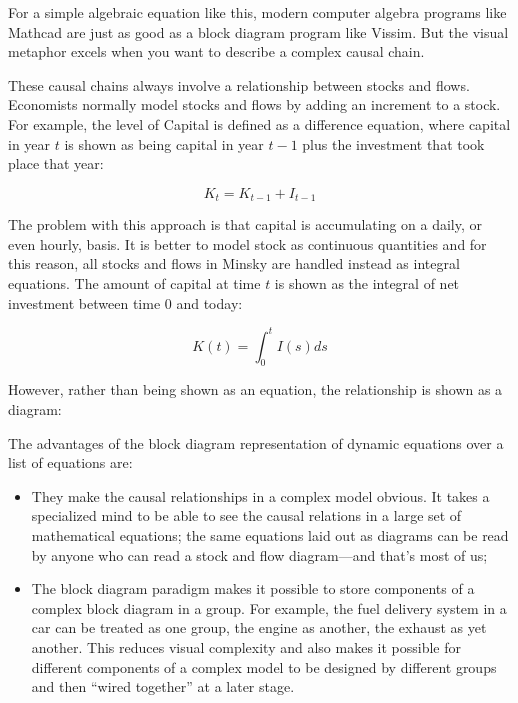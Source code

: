 \begin{center}
\end{center}

For a simple algebraic equation like this, modern computer algebra
programs like Mathcad are just as good as a block diagram program like
Vissim. But the visual metaphor excels when you want to describe a
complex causal chain.


These causal chains always involve a relationship between stocks and
flows. Economists normally model stocks and flows by adding an
increment to a stock. For example, the level of Capital is defined as
a difference equation, where capital in year $t$ is shown as being 
capital in year $t-1$ plus the investment that took place that year:

\begin{displaymath}
K_t=K_{t-1}+I_{t-1}
\end{displaymath}

The problem with this approach is that capital is accumulating on a daily, 
or even hourly, basis. It is better to model stock as continuous quantities
and for this reason, all stocks and flows in Minsky are handled instead 
as integral equations. The amount of capital at time $t$ is shown as 
the integral of net investment between time 0 and today:

\begin{displaymath}
K(t)=\int_0^t I(s)ds
\end{displaymath}

However, rather than being shown as an equation, the relationship is shown as a diagram:

\begin{center}
\end{center}

The advantages of the block diagram representation of dynamic equations
over a list of equations are:
\begin{itemize}
\item    They make the causal relationships in a complex model
  obvious. It takes a specialized mind to be able to see the causal
  relations in a large set of mathematical equations; the same
  equations laid out as diagrams can be read by anyone who can read
  a stock and flow diagram---and that's most of us;
\item The block diagram paradigm makes it possible to store components of
  a complex block diagram in a group. For example, the fuel delivery
  system in a car can be treated as one group, the engine as another,
  the exhaust as yet another. This reduces visual complexity and also
  makes it possible for different components of a complex model to be
  designed by different groups and then ``wired together'' at a later
  stage.
\end{itemize}

